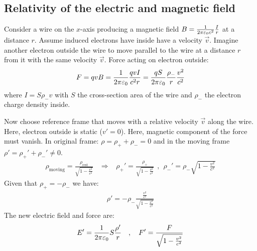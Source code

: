 \subsection{Relativity of the electric and magnetic field}

Consider a wire on the $x$-axis producing a magnetic field
$B = \frac{1}{2 \pi \varepsilon_0 c^2} \frac{I}{r}$ at a distance $r$.
Assume induced electrons have inside have a velocity $\vec{v}$.
Imagine another electron outside the wire to move parallel to the wire
at a distance $r$ from it with the same velocity $\vec{v}$. Force
acting on electron outside:
\begin{align*}
    F = q v B = \frac{1}{2 \pi \varepsilon_0} \frac{q v I}{c^2 r}
    = \frac{q S}{2 \pi \varepsilon_0} \frac{\rho_-}{r} \frac{v^2}{c^2}
\end{align*}
where $I = S \rho_- v$ with $S$ the cross-section area of the wire
and $\rho_-$ the electron charge density inside.

\vspace{1\baselineskip}

Now choose reference frame that moves with a relative velocity
$\vec{v}$ along the wire. Here, electron outside is static ($v' = 0$).
Here, magnetic component of the force must vanish. In original frame:
$\rho = \rho_+ + \rho_- = 0$ and in the moving frame $\rho' = \rho_+'
+ \rho_-' \neq 0$.
\begin{align*}
    \rho_{\text{moving}} = \frac{\rho_{\text{rest}}}{\sqrt{1 - \frac{v^2}{c^2}}}
    \hspace{10pt} \Rightarrow \hspace{10pt}
    \rho_+' = \frac{\rho_+}{\sqrt{1 - \frac{v^2}{c^2}}}
    \hspace{5pt} , \hspace{5pt}
    \rho_-' = \rho_- \sqrt{1 - \frac{v^2}{c^2}}
\end{align*}
Given that $\rho_+ = - \rho_-$ we have:
\begin{align*}
    \rho' = - \rho_- \frac{\frac{v^2}{c^2}}{\sqrt{1 - \frac{v^2}{c^2}}}
\end{align*}
The new electric field and force are:
\begin{align*}
    E' = \frac{1}{2 \pi \varepsilon_0} S \frac{\rho'}{r}
    \hspace{10pt} , \hspace{10pt}
    F' = \frac{F}{\sqrt{1 - \frac{v^2}{c^2}}}
\end{align*}